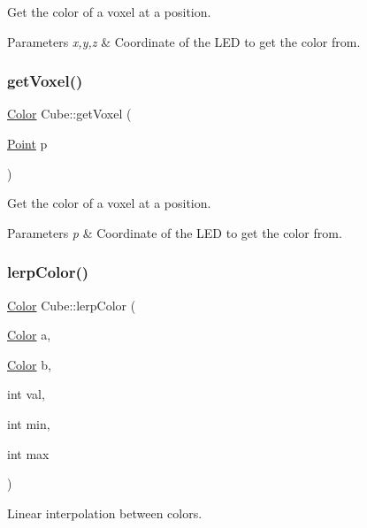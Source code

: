 Get the color of a voxel at a position. 


\begin{DoxyParams}{Parameters}
{\em x,y,z} & Coordinate of the L\+ED to get the color from. \\
\hline
\end{DoxyParams}
\mbox{\label{classCube_a975fe9a893595160a1726612b1c57717}} 
\subsubsection{\texorpdfstring{getVoxel()}{getVoxel()}\hspace{0.1cm}{\footnotesize\ttfamily [2/2]}}
{\footnotesize\ttfamily \mbox{\hyperlink{structColor}{Color}} Cube\+::get\+Voxel (\begin{DoxyParamCaption}\item[{\mbox{\hyperlink{structPoint}{Point}}}]{p }\end{DoxyParamCaption})}



Get the color of a voxel at a position. 


\begin{DoxyParams}{Parameters}
{\em p} & Coordinate of the L\+ED to get the color from. \\
\hline
\end{DoxyParams}
\mbox{\label{classCube_ab9d5f5ea67787fc718c74a4786491d36}} 
\subsubsection{\texorpdfstring{lerpColor()}{lerpColor()}}
{\footnotesize\ttfamily \mbox{\hyperlink{structColor}{Color}} Cube\+::lerp\+Color (\begin{DoxyParamCaption}\item[{\mbox{\hyperlink{structColor}{Color}}}]{a,  }\item[{\mbox{\hyperlink{structColor}{Color}}}]{b,  }\item[{int}]{val,  }\item[{int}]{min,  }\item[{int}]{max }\end{DoxyParamCaption})}



Linear interpolation between colors. 


